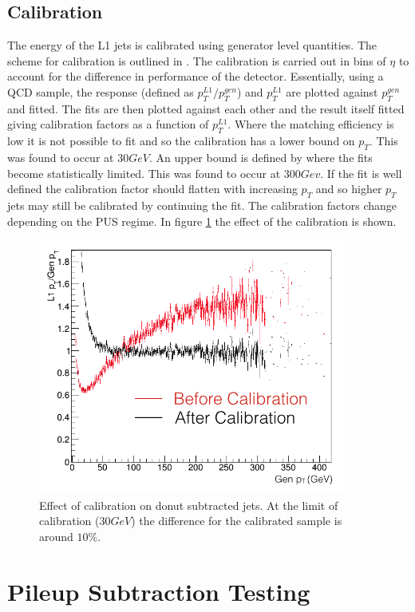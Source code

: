 \subsection{Calibration}
The energy of the L1 jets is calibrated using generator level quantities. The scheme for calibration is outlined in \cite{l1jet_calibration}. The calibration is carried out in bins of $\eta$ to account for the difference in performance of the detector. Essentially, using a QCD sample, the response (defined as $p^{L1}_{T}/p^{gen}_{T}$) and $p^{L1}_{T}$ are plotted against $p^{gen}_{T}$ and fitted. The fits are then plotted against each other and the result itself fitted giving calibration factors as a function of $p^{L1}_{T}$.  Where the matching efficiency is low it is not possible to fit and so the calibration has a lower bound on $p_T$. This was found to occur at $30GeV$. An upper bound is defined by where the fits become statistically limited. This was found to occur at $300Gev$. If the fit is well defined the calibration factor should flatten with increasing $p_T$ and so higher $p_T$ jets may still be calibrated by continuing the fit. The calibration factors change depending on the PUS regime. In figure \ref{calib} the effect of the calibration is shown.   

\begin{figure}
\centering
    \includegraphics[width=0.9\textwidth]{./Figures/calibration}
  \caption{Effect of calibration on donut subtracted jets. At the limit of calibration ($30GeV$) the difference for the calibrated sample is around $10\%$.}
  \label{calib}
\end{figure}
\section{Pileup Subtraction Testing}

